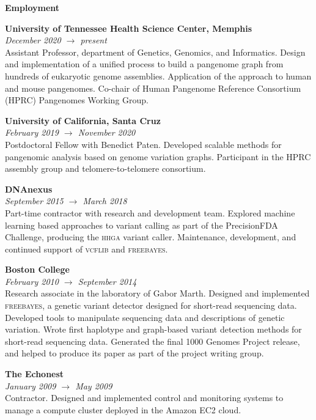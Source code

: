 \documentclass[11pt,hidelinks,letterpaper]{article}
\begin{document}
\hfill \break
\hfill \break
\noindent
{\LARGE \bf Employment}

\hfill \break
\noindent
{\large \bf University of Tennessee Health Science Center, Memphis} \\
\emph{December 2020 $\to$ present} \\
\noindent
Assistant Professor, department of Genetics, Genomics, and Informatics.
Design and implementation of a unified process to build a pangenome graph from hundreds of eukaryotic genome assemblies.
Application of the approach to human and mouse pangenomes.
Co-chair of Human Pangenome Reference Consortium (HPRC) Pangenomes Working Group.

\hfill \break
\noindent
{\large \bf University of California, Santa Cruz} \\
\emph{February 2019 $\to$ November 2020} \\
\noindent
Postdoctoral Fellow with Benedict Paten.
Developed scalable methods for pangenomic analysis based on genome variation graphs.
Participant in the HPRC assembly group and telomere-to-telomere consortium.

\hfill \break
\noindent
{\large \bf DNAnexus} \\
\emph{September 2015 $\to$ March 2018} \\
\noindent
Part-time contractor with research and development team. Explored machine learning based approaches to variant calling as part of the PrecisionFDA Challenge, producing the \textsc{hhga} variant caller.
Maintenance, development, and continued support of \textsc{vcflib} and \textsc{freebayes}.

\hfill \break
\noindent
{\large \bf Boston College} \\
\emph{February 2010 $\to$ September 2014} \\
Research associate in the laboratory of Gabor Marth.
Designed and implemented \textsc{freebayes}, a genetic variant detector designed for short-read sequencing data.
Developed tools to manipulate sequencing data and descriptions of genetic variation.
Wrote first haplotype and graph-based variant detection methods for short-read sequencing data.
Generated the final 1000 Genomes Project release, and helped to produce its paper as part of the project writing group.


\hfill \break
\noindent
{\large \bf The Echonest} \\
\emph{January 2009 $\to$ May 2009} \\
Contractor. Designed and implemented control and monitoring systems to manage a compute cluster deployed in the Amazon EC2 cloud.
\end{document}
